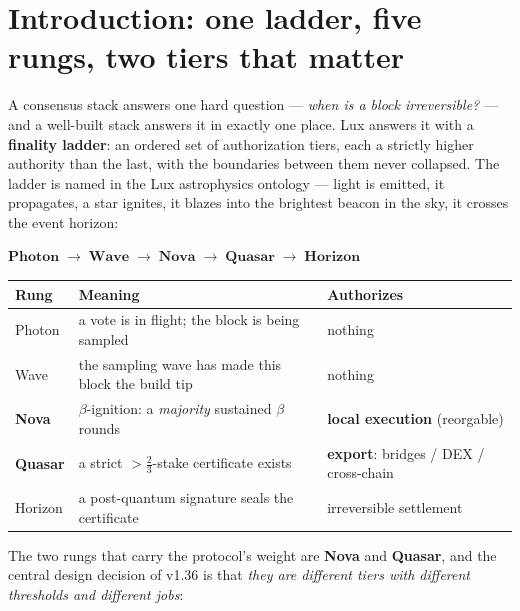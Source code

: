 \documentclass[11pt,a4paper]{article}
\begin{document}
\tableofcontents
\newpage

\section{Introduction: one ladder, five rungs, two tiers that matter}

A consensus stack answers one hard question --- \emph{when is a block irreversible?} ---
and a well-built stack answers it in exactly one place. Lux answers it with a
\textbf{finality ladder}: an ordered set of authorization tiers, each a strictly higher
authority than the last, with the boundaries between them never collapsed. The ladder is
named in the Lux astrophysics ontology --- light is emitted, it propagates, a star
ignites, it blazes into the brightest beacon in the sky, it crosses the event horizon:

\begin{center}
\(\textbf{Photon} \;\to\; \textbf{Wave} \;\to\; \textbf{Nova} \;\to\; \textbf{Quasar}
\;\to\; \textbf{Horizon}\)
\end{center}

\begin{center}
\begin{tabular}{@{}l l l@{}}
\toprule
\textbf{Rung} & \textbf{Meaning} & \textbf{Authorizes} \\
\midrule
Photon  & a vote is in flight; the block is being sampled           & nothing \\
Wave    & the sampling wave has made this block the build tip       & nothing \\
\textbf{Nova}   & \(\beta\)-ignition: a \emph{majority} sustained \(\beta\) rounds & \textbf{local execution} (reorgable) \\
\textbf{Quasar} & a strict \(>\tfrac{2}{3}\)-stake certificate exists       & \textbf{export}: bridges / DEX / cross-chain \\
Horizon & a post-quantum signature seals the certificate            & irreversible settlement \\
\bottomrule
\end{tabular}
\end{center}

The two rungs that carry the protocol's weight are \textbf{Nova} and \textbf{Quasar}, and
the central design decision of v1.36 is that \emph{they are different tiers with different
thresholds and different jobs}:
\end{document}
